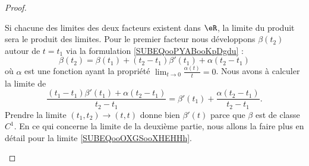 \begin{proof}
\begin{subproof}
        Si chacune des limites des deux facteurs existent dans \( \eR\), la limite du produit sera le produit des limites. Pour le premier facteur nous développons \( \beta(t_2)\) autour de \( t=t_1\) via la formulation \eqref{SUBEQooPYABooKpDgdu} :
        \begin{equation}
            \beta(t_2)=\beta(t_1)+(t_2-t_1)\beta'(t_1)+\alpha(t_2-t_1)
        \end{equation}
        où \( \alpha\) est une fonction ayant la propriété \( \lim_{t\to 0} \frac{ \alpha(t) }{ t }=0\). Nous avons à calculer la limite de
        \begin{equation}
            \frac{ (t_1-t_1)\beta'(t_1)+\alpha(t_2-t_1) }{ t_2-t_1 }=\beta'(t_1)+\frac{ \alpha(t_2-t_1) }{ t_2-t_1 }.
        \end{equation}
        Prendre la limite \( (t_1,t_2)\to (t,t)\) donne bien \( \beta'(t)\) parce que \( \beta\) est de classe \( C^1\). En ce qui concerne la limite de la deuxième partie, nous allons la faire plus en détail pour la limite \eqref{SUBEQooOXGSooXHEHHh}.


\end{subproof}
\end{proof}

